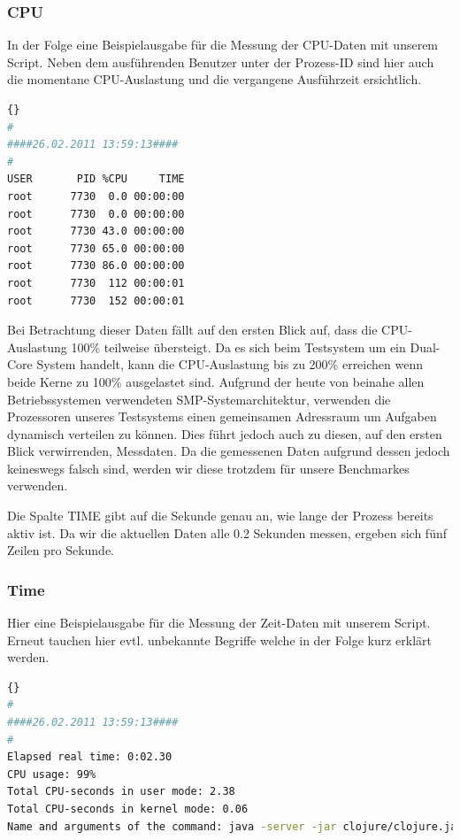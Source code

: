 \documentclass{fancydocument}
\begin{document}
\subsubsection{CPU}
In der Folge eine Beispielausgabe für die  Messung der CPU-Daten mit unserem Script. Neben dem ausführenden Benutzer unter der Prozess-ID sind hier auch die momentane CPU-Auslastung und die vergangene Ausführzeit ersichtlich.

\begin{minipage}{\textwidth}
\begin{lstlisting}[language=bash,caption=Speicherdaten]{}
#
####26.02.2011 13:59:13####
#
USER       PID %CPU     TIME
root      7730  0.0 00:00:00
root      7730  0.0 00:00:00
root      7730 43.0 00:00:00
root      7730 65.0 00:00:00
root      7730 86.0 00:00:00
root      7730  112 00:00:01
root      7730  152 00:00:01
\end{lstlisting}
\end{minipage}

Bei Betrachtung dieser Daten fällt auf den ersten Blick auf, dass die CPU-Auslastung 100\% teilweise übersteigt. Da es sich beim Testsystem um ein Dual-Core System handelt, kann die CPU-Auslastung bis zu 200\% erreichen wenn beide Kerne zu 100\% ausgelastet sind. Aufgrund der heute von beinahe allen Betriebssystemen verwendeten SMP-Systemarchitektur, verwenden die Prozessoren unseres Testsystems einen gemeinsamen Adressraum um Aufgaben dynamisch verteilen zu können. Dies führt jedoch auch zu diesen, auf den ersten Blick verwirrenden, Messdaten. Da die gemessenen Daten aufgrund dessen jedoch keineswegs falsch sind, werden wir diese trotzdem für unsere Benchmarkes verwenden.

Die Spalte TIME gibt auf die Sekunde genau an, wie lange der Prozess bereits aktiv ist. Da wir die aktuellen Daten alle 0.2 Sekunden messen, ergeben sich fünf Zeilen pro Sekunde.

\subsubsection{Time}

Hier eine Beispielausgabe für die Messung der Zeit-Daten mit unserem Script. Erneut tauchen hier evtl. unbekannte Begriffe welche in der Folge kurz erklärt werden.

\begin{minipage}{\textwidth}
\begin{lstlisting}[language=bash,caption=Speicherdaten]{}
#
####26.02.2011 13:59:13####
#
Elapsed real time: 0:02.30
CPU usage: 99%
Total CPU-seconds in user mode: 2.38
Total CPU-seconds in kernel mode: 0.06
Name and arguments of the command: java -server -jar clojure/clojure.jar
\end{lstlisting}
\end{minipage}
\end{document}
